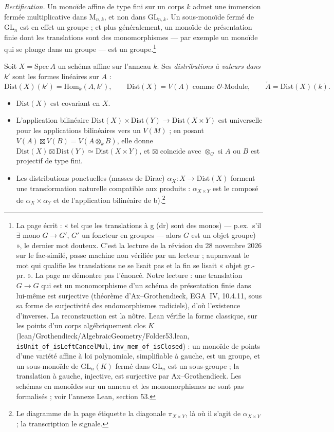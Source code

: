 \documentclass[11pt,a4paper]{article}
\begin{document}
\emph{Rectification.} Un monoïde affine de type fini sur un corps $k$ admet
une immersion fermée multiplicative dans $\mathrm{M}_{n,k}$, et non dans
$\mathrm{GL}_{n,k}$. Un sous-monoïde fermé de $\mathrm{GL}_{n}$ est en effet
un groupe ; et plus généralement, un monoïde de présentation finie dont les
translations sont des monomorphismes --- par exemple un monoïde qui se plonge
dans un groupe --- est un groupe.\footnote{La page écrit : « tel que les
translations à g (dr) sont des monos) --- p.ex.\ s'il $\exists$ mono
$G \to G'$, $G'$ un foncteur en groupes --- alors $G$ est un objet groupe) »,
le dernier mot douteux. C'est la lecture de la révision du 28 novembre 2026
sur le fac-similé, passe machine non vérifiée par un lecteur ; auparavant le
mot qui qualifie les translations ne se lisait pas et la fin se lisait
« objet gr.-pr. ». La page ne démontre pas l'énoncé. Notre lecture : une
translation $G \to G$ qui est un monomorphisme d'un schéma de présentation
finie dans lui-même est surjective (théorème d'Ax--Grothendieck, EGA~IV,
10.4.11, sous sa forme de surjectivité des endomorphismes radiciels), d'où
l'existence d'inverses. La reconstruction est la nôtre. Lean vérifie la
forme classique, sur les points d'un corps algébriquement clos $K$
(lean/Grothendieck/AlgebraicGeometry/Folder53.lean, \texttt{isUnit\_of\_isLeftCancelMul},
\texttt{inv\_mem\_of\_isClosed}) : un monoïde de points d'une variété affine
à loi polynomiale, simplifiable à gauche, est un groupe, et un sous-monoïde
de $\mathrm{GL}_{n}(K)$ fermé dans $\mathrm{GL}_{n}$ est un sous-groupe ; la
translation à gauche, injective, est surjective par Ax--Grothendieck. Les
schémas en monoïdes sur un anneau et les monomorphismes ne sont pas
formalisés ; voir l'annexe Lean, section 53.}

Soit $X = \mathrm{Spec}\, A$ un schéma affine sur l'anneau $k$. Ses
\emph{distributions à valeurs dans} $k'$ sont les formes linéaires sur $A$ :
\[
  \mathrm{Dist}(X)(k') = \mathrm{Hom}_{k}(A, k'), \qquad
  \mathrm{Dist}(X) = V(A) \text{ comme $\mathcal{O}$-Module}, \qquad
  \check{A} = \mathrm{Dist}(X)(k) .
\]
\begin{itemize}
\item[a)] $\mathrm{Dist}(X)$ est covariant en $X$.
\item[b)] L'application bilinéaire
$\mathrm{Dist}(X) \times \mathrm{Dist}(Y) \to \mathrm{Dist}(X \times Y)$
est universelle pour les applications bilinéaires vers un $V(M)$ ; en posant
$V(A) \boxtimes V(B) = V(A \otimes_{k} B)$, elle donne
$\mathrm{Dist}(X) \boxtimes \mathrm{Dist}(Y) \simeq \mathrm{Dist}(X \times Y)$,
et $\boxtimes$ coïncide avec $\otimes_{\mathcal{O}}$ si $A$ ou $B$ est
projectif de type fini.
\item[c)] Les distributions ponctuelles (masses de Dirac)
$\alpha_{X} \colon X \to \mathrm{Dist}(X)$ forment une transformation
naturelle compatible aux produits :
$\alpha_{X \times Y}$ est le composé de $\alpha_{X} \times \alpha_{Y}$ et de
l'application bilinéaire de b).\footnote{Le diagramme de la page étiquette la
diagonale $\pi_{X \times Y}$, là où il s'agit de $\alpha_{X \times Y}$ ; la
transcription le signale.}
\end{itemize}
\end{document}
